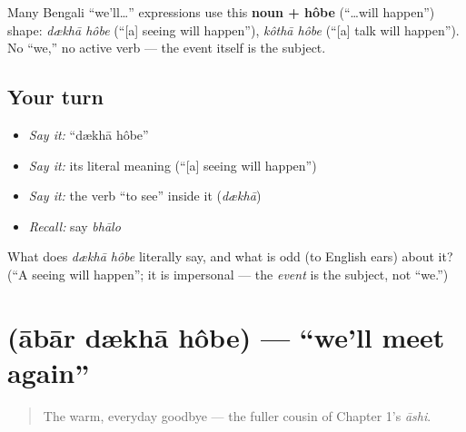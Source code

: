 \begin{grammarlens}[title={Grammar Lens: the impersonal future}]
Many Bengali \textquotedblleft{}we'll…\textquotedblright{} expressions use this \textbf{noun + hôbe} (\textquotedblleft{}…will happen\textquotedblright{}) shape: \emph{dækhā hôbe} (\textquotedblleft{}{[}a{]} seeing will happen\textquotedblright{}), \emph{kôthā hôbe} (\textquotedblleft{}{[}a{]} talk will happen\textquotedblright{}). No \textquotedblleft{}we,\textquotedblright{} no active verb — the event itself is the subject.
\end{grammarlens}

\subsection*{Your turn}
\begin{itemize}
\raggedright
  \item \emph{Say it:} \textquotedblleft{}dækhā hôbe\textquotedblright{}
  \item \emph{Say it:} its literal meaning (\textquotedblleft{}{[}a{]} seeing will happen\textquotedblright{})
  \item \emph{Say it:} the verb \textquotedblleft{}to see\textquotedblright{} inside it (\emph{dækhā})
  \item \emph{Recall:} say \emph{bhālo}
\end{itemize}

\begin{tcolorbox}[breakable,colback=teal!4,colframe=teal!35!black,title={Before you move on}]
What does \emph{dækhā hôbe} literally say, and what is odd (to English ears) about it? (\textquotedblleft{}A seeing will happen\textquotedblright{}; it is impersonal — the \emph{event} is the subject, not \textquotedblleft{}we.\textquotedblright{})
\end{tcolorbox}
\section[\texorpdfstring{\bn{আবার} \bn{দেখা} \bn{হবে} (ābār dækhā hôbe)}{আবার দেখা হবে (ābār dækhā hôbe)}]{   (ābār dækhā hôbe) — \textquotedblleft{}we'll meet again\textquotedblright{}}

\label{lesson:BN-C04-abar-dekha-hobe}



\begin{quote}
The warm, everyday goodbye — the fuller cousin of Chapter 1's \emph{āshi}.
\end{quote}

